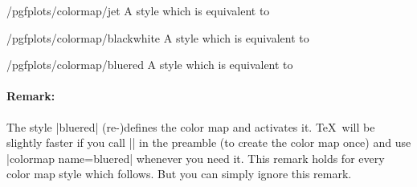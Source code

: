 \begin{stylekey}{/pgfplots/colormap/jet}
	A style which is equivalent to 
\begin{codeexample}
\end{codeexample}


	\matlabcolormaptext
\end{stylekey}

\begin{stylekey}{/pgfplots/colormap/blackwhite}
	A style which is equivalent to
\begin{codeexample}
\end{codeexample}

\end{stylekey}


\begin{stylekey}{/pgfplots/colormap/bluered}
	A style which is equivalent to
\begin{codeexample}
\end{codeexample}


\begin{codeexample}[]
\end{codeexample}

	\paragraph{Remark:} 
	The style |bluered| (re-)defines the color map and activates it. \TeX\ will be slightly faster if you call |\pgfplotsset{colormap/bluered}| in the preamble (to create the color map once) and use |colormap name=bluered| whenever you need it. This remark holds for every color map style which follows. But you can simply ignore this remark.
\end{stylekey}

